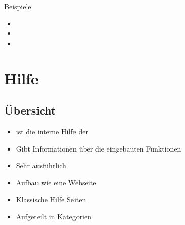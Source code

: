 \documentclass[aspectratio=43]{beamer}
\begin{document}
\begin{frame} 

	\begin{exampleblock}{Beispiele} 
	\begin{itemize}
	\item {}
       \item {}
       \item {}
	\end{itemize}
	\end{exampleblock}

\end{frame}

\section{Hilfe}
\subsection{Übersicht}
\begin{frame} 

	\begin{block}{} 
	\begin{itemize}
	\item {} ist die interne Hilfe der 
	\item Gibt Informationen über die eingebauten Funktionen
	\end{itemize}
	\end{block}

	\begin{block}{} 
	\begin{itemize}
	\item Sehr ausführlich 
	\item Aufbau wie eine Webseite
	\end{itemize}
	\end{block}
	
	\begin{block}{} 
	\begin{itemize}
	\item Klassische Hilfe Seiten
	\item Aufgeteilt in Kategorien  
	\end{itemize}
	\end{block}

\end{frame}
\end{document}
